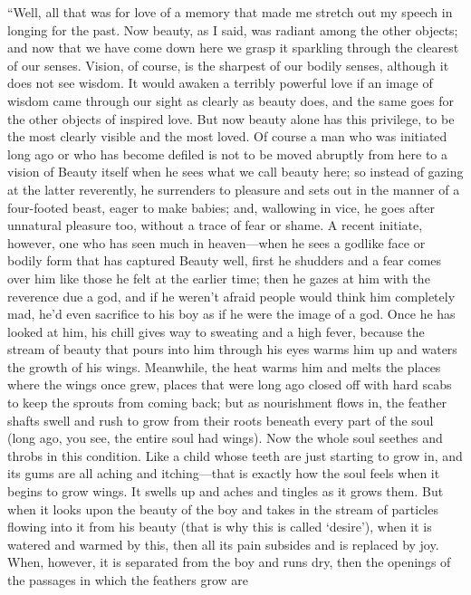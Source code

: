 “Well, all that was for love of a memory that made me stretch out my 
speech in longing for the past. Now beauty, as I said, was
radiant among the other objects; and now that we have come down here we
grasp it sparkling through the clearest of our senses. Vision, of
course, is the sharpest of our bodily senses, although it does not see
wisdom. It would awaken a terribly powerful love if an image of wisdom
came through our sight as clearly as beauty does, and the same goes for
the other objects of inspired love. But now beauty alone has
this privilege, to be the most clearly visible and the most loved. Of
course a man who was initiated long ago or who has become defiled is not
to be moved abruptly from here to a vision of Beauty itself when he sees
what we call beauty here; so instead of gazing at the latter reverently,
he surrenders to pleasure and sets out in the manner of a four-footed
beast, eager to make babies; and, wallowing in vice, he 
goes after unnatural pleasure too, without a trace of fear or shame. A
recent initiate, however, one who has seen much in heaven---when he sees
a godlike face or bodily form that has captured Beauty well, first he
shudders and a fear comes over him like those he felt at the earlier
time; then he gazes at him with the reverence due a god, and if he
weren't afraid people would think him completely mad, he'd even
sacrifice to his boy as if he were the image of a god. Once he
has looked at him, his chill gives way to sweating and a high fever,
because the stream of beauty that pours into him through his eyes warms
him up and waters the growth of his wings. Meanwhile, the heat warms him
and melts the places where the wings once grew, places that were long
ago closed off with hard scabs to keep the sprouts from coming back; but
as nourishment flows in, the feather shafts swell and rush to grow from
their roots beneath every part of the soul (long ago, you see, the
entire soul had wings). Now the whole soul seethes and throbs in
this condition. Like a child whose teeth are just starting to grow in,
and its gums are all aching and itching---that is exactly how the soul
feels when it begins to grow wings. It swells up and aches and tingles
as it grows them. But when it looks upon the beauty of the boy and takes
in the stream of particles flowing into it from his beauty (that is why
this is called
‘desire'), when it is
watered and warmed by this, then all its pain subsides and is replaced
by joy. When, however, it is separated from the boy and runs
dry, then the openings of the passages in which the feathers grow are
